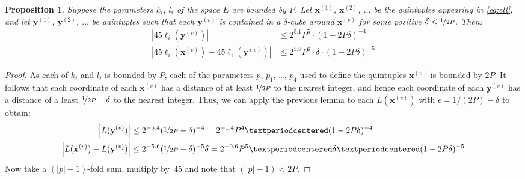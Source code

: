 \documentclass{article}
\newtheorem{prop}[thm]{Proposition}
\newcommand{\abs}[1]{\left|#1\right|}
\renewcommand{\vec}[1]{\mathbf{#1}}
\begin{document}
\begin{prop}\label{prop:ell}
  Suppose the parameters \(k_i\), \(l_i\) of the space \(E\) are bounded by \(P\).  
  Let \(\vec x^{(1)}\), \(\vec x^{(2)}\), \(\dots\) be the quintuples appearing in \eqref{eq:ell},
  and let \(\vec y^{(1)}\), \(\vec y^{(2)}\), \(\dots\) be quintuples such that each \(\vec y^{(v)}\) is contained in a \(\delta\)-cube around \(\vec x^{(v)}\) for some positive \(\delta < \nicefrac{1}{2P}\).
  Then:
  \begin{align}
    \abs{45\ell_i(\vec y^{(v)})}                          & \leq 2^{5.1} P^5 · (1-2P\delta)^{-4} \\
    \abs{45\ell_i(\vec x^{(v)}) - 45\ell_i(\vec y^{(v)})} & \leq 2^{5.9} P^6 · \delta · (1-2P\delta)^{-5}
  \end{align}
\end{prop}
\begin{proof}
  As each of \(k_i\) and \(l_i\) is bounded by \(P\), each of the parameters \(p\), \(p_1\), \dots, \(p_4\) used to define the quintuples \(\vec x^{(v)}\) is bounded by \(2P\).  It follows that each coordinate of each \(\vec x^{(v)}\) has a distance of at least \(\nicefrac{1}{2P}\) to the nearest integer, and hence each coordinate of each \(\vec y^{(v)}\) has a distance of a least \(\nicefrac{1}{2P}-\delta\) to the nearest integer.   Thus, we can apply the previous lemma to each \(L(\vec x^{(v)})\) with \(\epsilon = 1/(2P)-\delta\) to obtain:
  \begin{align*}
    \abs{L(\vec y^{(v)})}
    &\leq 2^{-5.4}(\nicefrac{1}{2P}-\delta)^{-4} = 2^{-1.4}P^4·(1-2P\delta)^{-4}\\
    \abs{L(\vec x^{(v)}) - L(\vec y^{(v)})}
    &\leq 2^{-5.6} (\nicefrac{1}{2P}-\delta)^{-5}\delta = 2^{-0.6}P^5·\delta·(1-2P\delta)^{-5}
  \end{align*}
  Now take a \((\abs{p}-1)\)-fold sum, multiply by~\(45\) and note that \((\abs{p}-1) < 2P\).
\end{proof}
\end{document}
